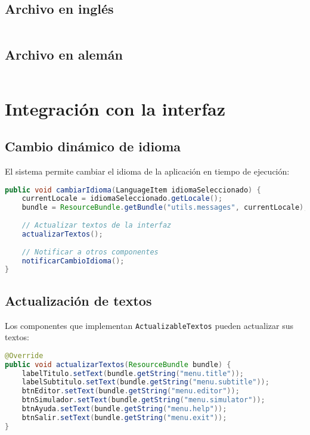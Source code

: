 \subsection{Archivo en inglés}

\inputminted[linenos,breaklines,firstline=1,lastline=30]{properties}{codigo/src/utils/messages_en.properties}

\subsection{Archivo en alemán}

\inputminted[linenos,breaklines,firstline=1,lastline=30]{properties}{codigo/src/utils/messages_de.properties}

\section{Integración con la interfaz}

\subsection{Cambio dinámico de idioma}

El sistema permite cambiar el idioma de la aplicación en tiempo de ejecución:

\begin{lstlisting}[language=Java, caption=Método para cambiar idioma]
public void cambiarIdioma(LanguageItem idiomaSeleccionado) {
    currentLocale = idiomaSeleccionado.getLocale();
    bundle = ResourceBundle.getBundle("utils.messages", currentLocale);
    
    // Actualizar textos de la interfaz
    actualizarTextos();
    
    // Notificar a otros componentes
    notificarCambioIdioma();
}
\end{lstlisting}

\subsection{Actualización de textos}

Los componentes que implementan \texttt{ActualizableTextos} pueden actualizar sus textos:

\begin{lstlisting}[language=Java, caption=Implementación de actualización de textos]
@Override
public void actualizarTextos(ResourceBundle bundle) {
    labelTitulo.setText(bundle.getString("menu.title"));
    labelSubtitulo.setText(bundle.getString("menu.subtitle"));
    btnEditor.setText(bundle.getString("menu.editor"));
    btnSimulador.setText(bundle.getString("menu.simulator"));
    btnAyuda.setText(bundle.getString("menu.help"));
    btnSalir.setText(bundle.getString("menu.exit"));
}
\end{lstlisting}

